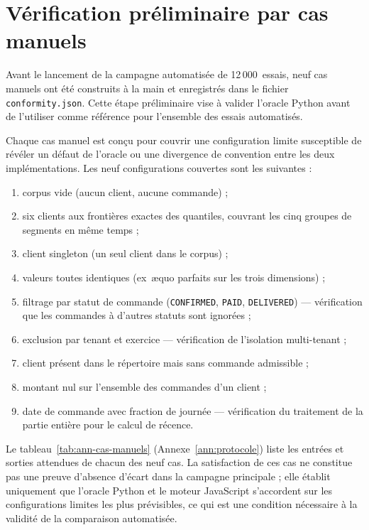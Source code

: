 \section{Vérification préliminaire par cas manuels}
\label{sec:methodes-cas-manuels}

Avant le lancement de la campagne automatisée de 12\,000~essais, neuf cas manuels ont été
construits à la main et enregistrés dans le fichier \texttt{conformity.json}. Cette étape
préliminaire vise à valider l'oracle Python avant de l'utiliser comme référence pour
l'ensemble des essais automatisés.

Chaque cas manuel est conçu pour couvrir une configuration limite susceptible de
révéler un défaut de l'oracle ou une divergence de convention entre les deux
implémentations. Les neuf configurations couvertes sont les suivantes :

\begin{enumerate}
  \item corpus vide (aucun client, aucune commande) ;
  \item six clients aux frontières exactes des quantiles, couvrant les cinq groupes
    de segments en même temps ;
  \item client singleton (un seul client dans le corpus) ;
  \item valeurs toutes identiques (ex~æquo parfaits sur les trois dimensions) ;
  \item filtrage par statut de commande (\texttt{CONFIRMED}, \texttt{PAID},
    \texttt{DELIVERED}) — vérification que les commandes à d'autres statuts sont ignorées ;
  \item exclusion par tenant et exercice — vérification de l'isolation multi-tenant ;
  \item client présent dans le répertoire mais sans commande admissible ;
  \item montant nul sur l'ensemble des commandes d'un client ;
  \item date de commande avec fraction de journée — vérification du traitement de la
    partie entière pour le calcul de récence.
\end{enumerate}

Le tableau~\ref{tab:ann-cas-manuels} (Annexe~\ref{ann:protocole}) liste les entrées et
sorties attendues de chacun des neuf cas. La satisfaction de ces cas ne constitue pas une
preuve d'absence d'écart dans la campagne principale ; elle établit uniquement que l'oracle
Python et le moteur JavaScript s'accordent sur les configurations limites les plus
prévisibles, ce qui est une condition nécessaire à la validité de la comparaison
automatisée.
